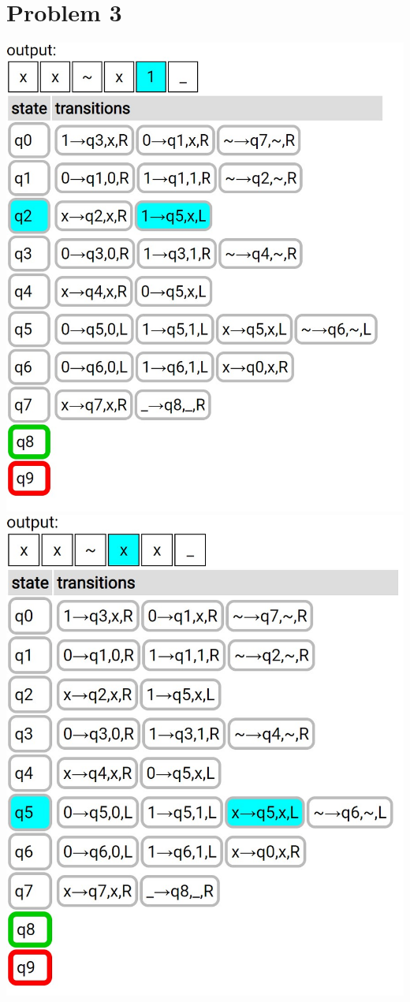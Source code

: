 \documentclass{article}
\newenvironment{problem}[1]{
  \nobreak\section*{Problem #1}
}{}
\begin{document}
\begin{problem}{3}
\begin{center}
      \includegraphics[scale=0.5]{images/10.jpg}
      \includegraphics[scale=0.5]{images/11.jpg}

\end{center}
\end{problem}
\end{document}
